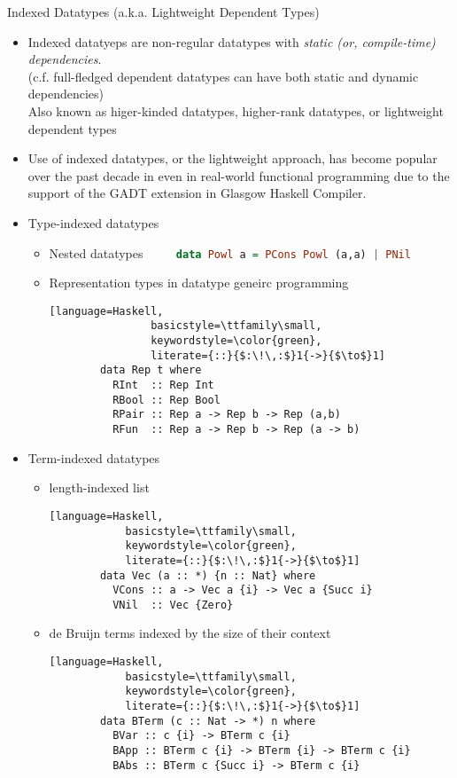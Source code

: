 \documentclass[final]{beamer}
\begin{document}
\begin{frame}[fragile]
\begin{columns}[t]
\begin{column}{.48\linewidth}
\begin{block}{Indexed Datatypes (a.k.a. Lightweight Dependent Types)}
\begin{itemize}
\item Indexed datatyeps are non-regular datatypes
	with \emph{static (or, compile-time) dependencies}.\\
        (c.f. full-fledged dependent datatypes can have
        both static and dynamic dependencies) \\
	Also known as higer-kinded datatypes, higher-rank datatypes,
	or lightweight dependent types
\item Use of indexed datatypes, or the lightweight approach,
	has become popular over the past decade
	in even in real-world functional programming
	due to the support of the GADT extension in Glasgow Haskell Compiler.
\item Type-indexed datatypes
	\begin{itemize}
		\item Nested datatypes $\qquad$
			\lstinline[language=Haskell,
				basicstyle=\ttfamily\small,
				keywordstyle=\color{green}]!data Powl a = PCons Powl (a,a) | PNil!
		\item Representation types in datatype geneirc programming
		\begin{lstlisting}[language=Haskell,
				basicstyle=\ttfamily\small,
				keywordstyle=\color{green},
				literate={::}{$:\!\,:$}1{->}{$\to$}1]
		data Rep t where
		  RInt  :: Rep Int
		  RBool :: Rep Bool
		  RPair :: Rep a -> Rep b -> Rep (a,b)
		  RFun  :: Rep a -> Rep b -> Rep (a -> b)
		\end{lstlisting}
	\end{itemize}
\item Term-indexed datatypes
	\begin{itemize}
        	\item length-indexed list
		\begin{lstlisting}[language=Haskell,
			basicstyle=\ttfamily\small,
			keywordstyle=\color{green},
			literate={::}{$:\!\,:$}1{->}{$\to$}1]
		data Vec (a :: *) {n :: Nat} where
		  VCons :: a -> Vec a {i} -> Vec a {Succ i}
		  VNil  :: Vec {Zero}
		\end{lstlisting}
		\item de Bruijn terms indexed by the size of their context
		\begin{lstlisting}[language=Haskell,
			basicstyle=\ttfamily\small,
			keywordstyle=\color{green},
			literate={::}{$:\!\,:$}1{->}{$\to$}1]
		data BTerm (c :: Nat -> *) n where
		  BVar :: c {i} -> BTerm c {i}
		  BApp :: BTerm c {i} -> BTerm {i} -> BTerm c {i}
		  BAbs :: BTerm c {Succ i} -> BTerm c {i}
		\end{lstlisting}
	\end{itemize}
\end{itemize} %
\end{block}


\end{column}
\end{columns}
\end{frame}
\end{document}
